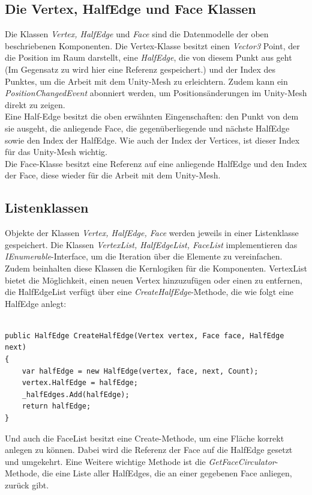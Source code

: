 \subsection{Die Vertex, HalfEdge und Face Klassen}
Die Klassen \textit{Vertex, HalfEdge} und \textit{Face} sind die Datenmodelle der oben beschriebenen Komponenten. Die Vertex-Klasse besitzt einen \textit{Vector3} Point, der die Position im Raum darstellt, eine \textit{HalfEdge}, die von diesem Punkt aus geht (Im Gegensatz zu \cite{Meshmash2017} wird hier eine Referenz gespeichert.) und der Index des Punktes, um die Arbeit mit dem Unity-Mesh zu erleichtern. Zudem kann ein \textit{PositionChangedEvent} abonniert werden, um Positions\"anderungen im Unity-Mesh direkt zu zeigen.
\\
Eine Half-Edge besitzt die oben erw\"ahnten Eingenschaften: den Punkt von dem sie ausgeht, die anliegende Face, die gegen\"uberliegende und n\"achste HalfEdge sowie den Index der HalfEdge. Wie auch der Index der Vertices, ist dieser Index f\"ur das Unity-Mesh wichtig.
\\
Die Face-Klasse besitzt eine Referenz auf eine anliegende HalfEdge und den Index der Face, diese wieder f\"ur die Arbeit mit dem Unity-Mesh.

\subsection{Listenklassen}
Objekte der Klassen \textit{Vertex, HalfEdge, Face} werden jeweils in einer Listenklasse gespeichert. Die Klassen \textit{VertexList, HalfEdgeList, FaceList} implementieren das \textit{IEnumerable}-Interface, um die Iteration \"uber die Elemente zu vereinfachen. Zudem beinhalten diese Klassen die Kernlogiken f\"ur die Komponenten. VertexList bietet die M\"oglichkeit, einen neuen Vertex hinzuzuf\"ugen oder einen zu entfernen, die HalfEdgeList verf\"ugt \"uber eine  \textit{CreateHalfEdge}-Methode, die wie folgt eine HalfEdge anlegt:

\begin{lstlisting}

public HalfEdge CreateHalfEdge(Vertex vertex, Face face, HalfEdge next)
{
	var halfEdge = new HalfEdge(vertex, face, next, Count);
	vertex.HalfEdge = halfEdge;
	_halfEdges.Add(halfEdge);
	return halfEdge;
}

\end{lstlisting}

Und auch die FaceList besitzt eine Create-Methode, um eine Fl\"ache korrekt anlegen zu k\"onnen. Dabei wird die Referenz der Face auf die HalfEdge gesetzt und umgekehrt. Eine Weitere wichtige Methode ist die \textit{GetFaceCirculator}-Methode, die eine Liste aller HalfEdges, die an einer gegebenen Face anliegen, zur\"uck gibt.

